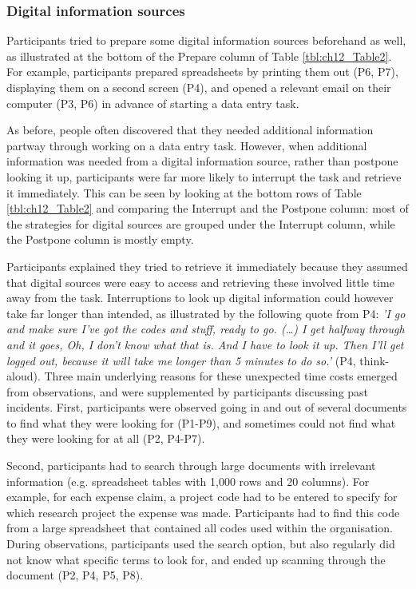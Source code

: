 \subsubsection{Digital information sources}
Participants tried to prepare some digital information sources beforehand as well, as illustrated at the bottom of the Prepare column of Table \ref{tbl:ch12_Table2}. For example, participants prepared spreadsheets by printing them out (P6, P7), displaying them on a second screen (P4), and opened a relevant email on their computer (P3, P6) in advance of starting a data entry task. 

As before, people often discovered that they needed additional information partway through working on a data entry task. However, when additional information was needed from a digital information source, rather than postpone looking it up, participants were far more likely to interrupt the task and retrieve it immediately. This can be seen by looking at the bottom rows of Table \ref{tbl:ch12_Table2}  and comparing the Interrupt and the Postpone column: most of the strategies for digital sources are grouped under the Interrupt column, while the Postpone column is mostly empty.  

Participants explained they tried to retrieve it immediately because they assumed that digital sources were easy to access and retrieving these involved little time away from the task. Interruptions to look up digital information could however take far longer than intended, as illustrated by the following quote from P4: \textit{'I go and make sure I’ve got the codes and stuff, ready to go. (…) I get halfway through and it goes, Oh, I don’t know what that is. And I have to look it up. Then I’ll get logged out, because it will take me longer than 5 minutes to do so.'} (P4, think-aloud). Three main underlying reasons for these unexpected time costs emerged from observations, and were supplemented by participants discussing past incidents. First, participants were observed going in and out of several documents to find what they were looking for (P1-P9), and sometimes could not find what they were looking for at all (P2, P4-P7). 

Second, participants had to search through large documents with irrelevant information (e.g. spreadsheet tables with 1,000 rows and 20 columns). For example, for each expense claim, a project code had to be entered to specify for which research project the expense was made. Participants had to find this code from a large spreadsheet that contained all codes used within the organisation. During observations, participants used the search option, but also regularly did not know what specific terms to look for, and ended up scanning through the document (P2, P4, P5, P8). 

